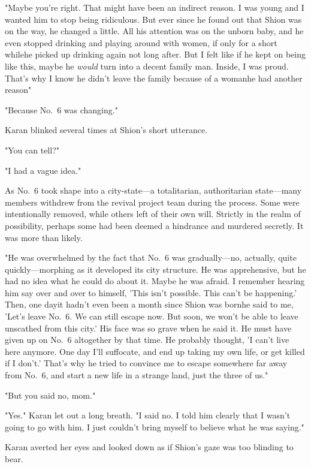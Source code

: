 "Maybe you're right. That might have been an indirect reason. I
was young and I wanted him to stop being ridiculous. But ever since he
found out that Shion was on the way, he changed a little. All his
attention was on the unborn baby, and he even stopped drinking and
playing around with women, if only for a short while\el he picked up
drinking again not long after. But I felt like if he kept on being like
this, maybe he \emph{would} turn into a decent family man. Inside, I was proud.
That's why I know he didn't leave the family because of a woman\el he
had another reason\el "

"Because No.~6 was changing."

Karan blinked several times at Shion's short utterance.

"You can tell?"

"I had a vague idea."

As No.~6 took shape into a city-state---a totalitarian, authoritarian
state---many members withdrew from the revival project team during the
process. Some were intentionally removed, while others left of their own
will. Strictly in the realm of possibility, perhaps some had been deemed
a hindrance and murdered secretly. It was more than likely.

"He was overwhelmed by the fact that No.~6 was gradually---no, actually,
quite quickly---morphing as it developed its city structure. He was
apprehensive, but he had no idea what he could do about it. Maybe he was
afraid. I remember hearing him say over and over to himself, 'This isn't
possible. This can't be happening.' Then, one day\el it hadn't even been
a month since Shion was born\el he said to me, 'Let's leave No.~6. We
can still escape now. But soon, we won't be able to leave unscathed from
this city.' His face was so grave when he said it. He must have given up
on No.~6 altogether by that time. He probably thought, 'I can't live
here anymore. One day I'll suffocate, and end up taking my own life, or
get killed if I don't.' That's why he tried to convince me to escape
somewhere far away from No.~6, and start a new life in a strange land,
just the three of us."

"But you said no, mom."

"Yes." Karan let out a long breath. "I said no. I told him clearly that
I wasn't going to go with him. I just couldn't bring myself to believe
what he was saying."

Karan averted her eyes and looked down as if Shion's gaze was too
blinding to bear.

